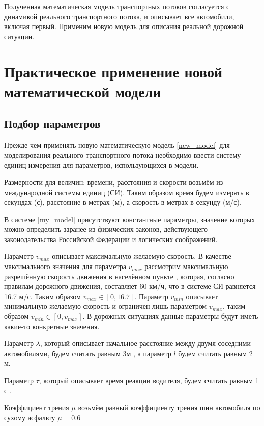 \documentclass[12pt, a4paper]{extarticle}
\numberwithin{equation}{section}
\begin{document}
Полученная математическая модель транспортных потоков согласуется с динамикой реального транспортного потока, и описывает все автомобили, включая первый. Применим новую модель для описания реальной дорожной ситуации.

\section{Практическое применение новой математической модели} 

\subsection{Подбор параметров} 

Прежде чем применять новую математическую модель \eqref{new_model} для моделирования реального транспортного потока необходимо ввести систему единиц измерения для параметров, использующихся в модели.

Размерности для величин: времени, расстояния и скорости возьмём из международной системы единиц (СИ). Таким образом время будем измерять в секундах (с), расстояние в метрах (м), а скорость в метрах в секунду (м/с).

В системе \eqref{my_model} присутствуют константные параметры, значение которых можно определить заранее из физических законов, действующего законодательства Российской Федерации и логических соображений.

Параметр $v_{max}$ описывает максимальную желаемую скорость. В качестве максимального значения для параметра $v_{max}$ рассмотрим максимальную разрешённую скорость движения в населённом пункте \cite{PDD}, которая, согласно правилам дорожного движения, составляет 60 км/ч, что в системе СИ равняется 16.7 м/с. Таким образом $v_{max} \in [0,16.7]$. Параметр $v_{min}$ описывает минимальную желаемую скорость и ограничен лишь параметром $v_{max}$, таким образом $v_{min} \in [0,v_{max}]$. В дорожных ситуациях данные параметры будут иметь какие-то конкретные значения.

Параметр $\lambda$, который описывает начальное расстояние между двумя соседними автомобилями, будем считать равным 3м \cite{PDD}, а параметр $l$ будем считать равным 2 м.

Параметр $\tau$, который описывает время реакции водителя, будем считать равным 1 с \cite{PDD}.

Коэффициент трения $\mu$ возьмём равный коэффициенту трения шин автомобиля по сухому асфальту $\mu=0.6$ \cite{Physics}
\end{document}
